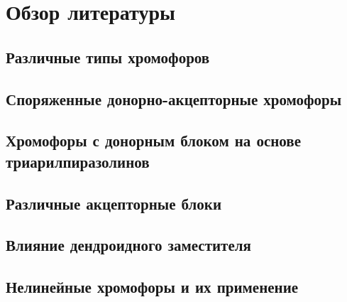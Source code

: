 \section{Обзор литературы}

\subsection{Различные типы хромофоров}

\subsection{Споряженные донорно-акцепторные хромофоры}

\subsection{Хромофоры с донорным блоком на основе триарилпиразолинов}

\subsection{Различные акцепторные блоки}

\subsection{Влияние дендроидного заместителя}

\subsection{Нелинейные хромофоры и их применение}

